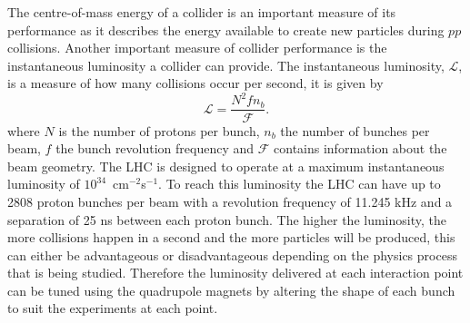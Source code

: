 
The centre-of-mass energy of a collider is an important measure of its performance as it describes the energy available to create new particles during $pp$ collisions. Another important measure of collider performance is the instantaneous luminosity a collider can provide. The instantaneous luminosity, $\mathcal{L}$, is a measure of how many collisions occur per second, it is given by
\begin{equation}
\mathcal{L} = \frac{N^{2} f n_{b}}{\mathcal{F}}.
\label{eq:inst_lumi}
\end{equation}
where $N$ is the number of protons per bunch, $n_{b}$ the number of bunches per beam, $f$ the bunch revolution frequency and $\mathcal{F}$ contains information about the beam geometry. The LHC is designed to operate at a maximum instantaneous luminosity of $10^{34}$~cm$^{-2}$s$^{-1}$. To reach this luminosity the LHC can have up to 2808 proton bunches per beam with a revolution frequency of 11.245 kHz and a separation of 25 ns between each proton bunch. %
The higher the luminosity, the more collisions happen in a second and the more particles will be produced, this can either be advantageous or disadvantageous depending on the physics process that is being studied.
Therefore the luminosity delivered at each interaction point can be tuned using the quadrupole magnets by altering the shape of each bunch to suit the experiments at each point.




